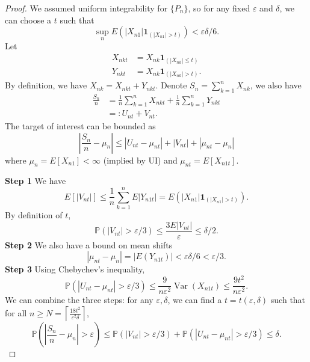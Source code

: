 \documentclass[11pt]{article}
\begin{document}
\begin{proof}
We assumed uniform integrability for $\{P_n\}$, so for any fixed $\varepsilon$ and $\delta$, we can choose a $t$ such that 
\begin{equation*}
\sup _n E\left(\left|X_{n 1}\right| \mathbf{1}_{\left(\left|X_{n 1}\right|>t\right)}\right)<\varepsilon \delta / 6.
\end{equation*}
Let
\begin{equation}
\begin{aligned}
X_{nkt} & =X_{nk} \mathbf{1}_{\left(\left|X_{nk}\right| \leq t\right)} \\
Y_{nkt} & =X_{nk} \mathbf{1}_{\left(\left|X_{nk}\right|>t\right)}.
\end{aligned}
\end{equation}
By definition, we have $X_{nk}=X_{nkt}+Y_{nkt}$. Denote $S_n = \sum_{k=1}^n X_{n k}$, we also have
\begin{equation*}
\begin{aligned}
\frac{S_n}{n} & =\frac{1}{n} \sum_{k=1}^n X_{nkt}+\frac{1}{n} \sum_{k=1}^n Y_{nkt} \\
& =: U_{nt}+V_{nt}.
\end{aligned}
\end{equation*}
The target of interest can be bounded as
\begin{equation*}
\left|\frac{S_n}{n}-\mu_n\right| \leq\left|U_{nt}-\mu_{nt}\right|+\left|V_{nt}\right|+\left|\mu_{nt}-\mu_n\right|
\end{equation*}
where $\mu_n = E[X_{n1}] < \infty$ (implied by UI) and $\mu_{nt}=E[X_{n1t}]$.

\textbf{Step 1} We have
$$
E[|V_{nt}|]\leq \frac{1}{n} \sum_{k=1}^n E\left|Y_{n1t}\right|=E\left(|X_{n1}| \mathbf{1}_{(|X_{n1}|>t)}\right).
$$
By definition of $t$,
\begin{equation*}
\mathbb{P}\left(\left|V_{nt}\right|>\varepsilon / 3\right) \leq \frac{3 E\left|V_{nt}\right|}{\varepsilon} \leq \delta / 2.
\end{equation*}
\textbf{Step 2} We also have a bound on mean shifts
\begin{equation*}
\left|\mu_{nt}-\mu_n\right| = \left|E\left(Y_{n1t}\right)\right|<\varepsilon \delta / 6<\varepsilon / 3.
\end{equation*}
\textbf{Step 3} Using Chebychev’s inequality,
\begin{equation*}
\mathbb{P}\left(\left|U_{n t}-\mu_{n t}\right|>\varepsilon/3\right) \leq \frac{9}{n\varepsilon^2} \operatorname{Var}\left(X_{n1t}\right)\le \frac{9t^2}{n\varepsilon^2}.
\end{equation*}
We can combine the three steps: for any $\varepsilon, \delta$, we can find a $t = t(\varepsilon,\delta)$ such that for all $n \geq N=\left\lceil\frac{18 t^2}{\varepsilon^2 \delta}\right\rceil$,
\begin{equation*}
\mathbb{P}\left(\left|\frac{S_n}{n}-\mu_n\right|>\varepsilon\right) \leq \mathbb{P}\left(\left|V_{n t}\right|>\varepsilon / 3\right) + \mathbb{P}\left(\left|U_{n t}-\mu_{n t}\right|>\varepsilon / 3\right) \leq \delta.
\end{equation*}
\end{proof}
\end{document}
